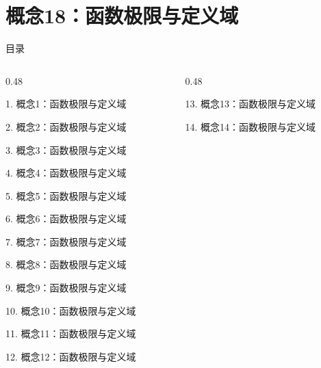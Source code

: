 \documentclass[aspectratio=169,10pt,fontset=fandol]{ctexbeamer}
\begin{document}
\section{概念18：函数极限与定义域}
\begin{frame}[t,fragile]{目录}
\small
\begin{columns}[T,onlytextwidth]
\begin{column}{0.48\textwidth}
{\color{black}\small 1. 概念1：函数极限与定义域\par}\vspace{0.22em}
{\color{black}\small 2. 概念2：函数极限与定义域\par}\vspace{0.22em}
{\color{black}\small 3. 概念3：函数极限与定义域\par}\vspace{0.22em}
{\color{black}\small 4. 概念4：函数极限与定义域\par}\vspace{0.22em}
{\color{black}\small 5. 概念5：函数极限与定义域\par}\vspace{0.22em}
{\color{black}\small 6. 概念6：函数极限与定义域\par}\vspace{0.22em}
{\color{black}\small 7. 概念7：函数极限与定义域\par}\vspace{0.22em}
{\color{black}\small 8. 概念8：函数极限与定义域\par}\vspace{0.22em}
{\color{black}\small 9. 概念9：函数极限与定义域\par}\vspace{0.22em}
{\color{black}\small 10. 概念10：函数极限与定义域\par}\vspace{0.22em}
{\color{black}\small 11. 概念11：函数极限与定义域\par}\vspace{0.22em}
{\color{black}\small 12. 概念12：函数极限与定义域\par}\vspace{0.22em}
\end{column}
\begin{column}{0.48\textwidth}
{\color{black}\small 13. 概念13：函数极限与定义域\par}\vspace{0.22em}
{\color{black}\small 14. 概念14：函数极限与定义域\par}\vspace{0.22em}

\end{column}
\end{columns}
\end{frame}
\end{document}
